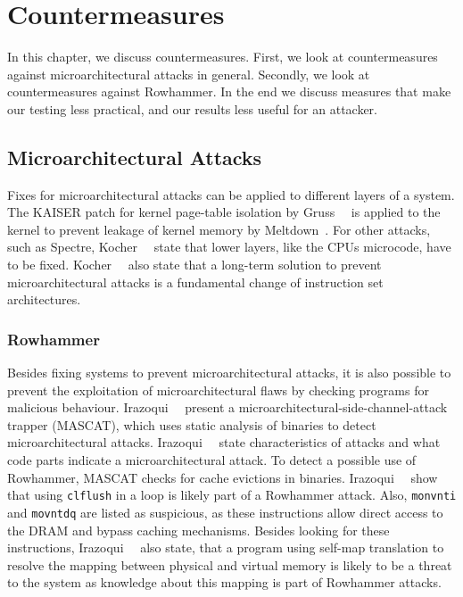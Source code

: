 \chapter{Countermeasures}\label{sec:countermeasure}

In this chapter, we discuss countermeasures. First, we look at countermeasures
against microarchitectural attacks in general. Secondly, we look at
countermeasures against Rowhammer. In the end we discuss measures that
make our testing less practical, and our results less useful for an
attacker.

\section{Microarchitectural Attacks}

Fixes for microarchitectural attacks can be applied to different layers of a
system. The KAISER patch for kernel page-table isolation by
Gruss~\etal~\cite{kaiserpaper} is applied to the kernel to prevent leakage of
kernel memory by Meltdown~\cite{meltdown}. For other attacks, such as Spectre,
Kocher~\etal~\cite{spectre} state that lower layers, like the
CPU\textquotesingle s microcode, have to be fixed. Kocher~\etal~\cite{spectre}
also state that a long-term solution to prevent microarchitectural attacks is a
fundamental change of instruction set architectures.

\subsection{Rowhammer}

Besides fixing systems to prevent microarchitectural attacks, it is also
possible to prevent the exploitation of microarchitectural flaws by checking
programs for malicious behaviour. Irazoqui~\etal~\cite{mascat} present a
microarchitectural-side-channel-attack trapper (MASCAT), which uses static
analysis of binaries to detect microarchitectural attacks.
Irazoqui~\etal~\cite{mascat} state characteristics of attacks and what code
parts indicate a microarchitectural attack. To detect a possible use of
Rowhammer, MASCAT checks for cache evictions in binaries.
Irazoqui~\etal~\cite{mascat} show that using \texttt{clflush} in a loop is
likely part of a Rowhammer attack. Also, \texttt{monvnti} and \texttt{movntdq}
are listed as suspicious, as these instructions allow direct access to the DRAM
and bypass caching mechanisms. Besides looking for these instructions,
Irazoqui~\etal~\cite{mascat} also state, that a program using self-map
translation to resolve the mapping between physical and virtual memory is likely
to be a threat to the system as knowledge about this mapping is part of
Rowhammer attacks.


